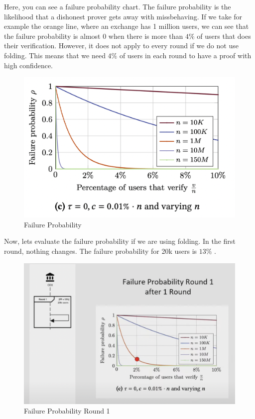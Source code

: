 Here, you can see a failure probability chart. The failure probability is the likelihood that a dishonest prover gets away with missbehaving.
If we take for example the orange line, where an exchange has 1 million users, we can see that the failure probability is almost 0 when there is more
than $4\%$  of users that does their verification.
However, it does not apply to every round if we do not use folding. This means that we need $4\%$  of users in each round to have a proof with high confidence.

\begin{figure}[H]
    \centering
    \includegraphics[width=130mm]{FailureProbability.png}
    \caption{Failure Probability \cite{GP21}}
    \label{overflow}
    \end{figure}

Now, lets evaluate the failure probability if we are using folding.
In the first round, nothing changes. The failure probability for 20k users is $13\%$ .

    \begin{figure}[H]
        \centering
        \includegraphics[width=130mm]{FailureProbabilityRound1.png}
        \caption{Failure Probability Round 1 \cite{NS23}}
        \label{overflow}
        \end{figure}

